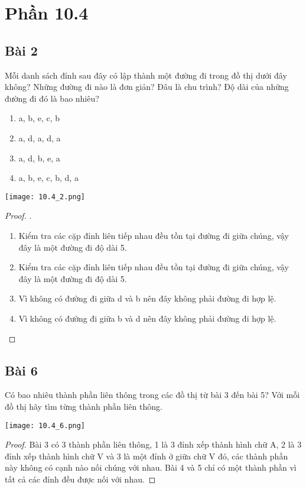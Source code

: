 \section*{Phần 10.4}
\subsection*{Bài 2}
Mỗi danh sách đỉnh sau đây có lập thành một đường đi trong đồ thị dưới đây không? Những đường đi nào là đơn giản? Đâu là chu trình? Độ dài của những đường đi đó là bao nhiêu?
\begin{enumerate}[label=\alph*)]
    \item a, b, e, c, b
    \item a, d, a, d, a
    \item a, d, b, e, a
    \item a, b, e, c, b, d, a
\end{enumerate}
\begin{center}
    \texttt{[image: 10.4\_2.png]}
\end{center}
\begin{proof}.
    \begin{enumerate}[label=\alph*)]
        \item Kiểm tra các cặp đỉnh liên tiếp nhau đều tồn tại đường đi giữa chúng, vậy đây là một đường đi độ dài 5.
        \item Kiểm tra các cặp đỉnh liên tiếp nhau đều tồn tại đường đi giữa chúng, vậy đây là một đường đi độ dài 5.
        \item Vì không có đường đi giữa d và b nên đây không phải đường đi hợp lệ.
        \item Vì không có đường đi giữa b và d nên đây không phải đường đi hợp lệ.
    \end{enumerate}
\end{proof}
\subsection*{Bài 6}
Có bao nhiêu thành phần liên thông trong các đồ thị từ bài 3 đến bài 5? Với mỗi đồ thị hãy tìm từng thành phần liên thông.
\begin{center}
    \texttt{[image: 10.4\_6.png]}
\end{center}
\begin{proof}
    Bài 3 có 3 thành phần liên thông, 1 là 3 đỉnh xếp thành hình chữ A, 2 là 3 đỉnh xếp thành hình chữ V và 3 là một đỉnh ở giữa chữ V đó, các thành phần này không có cạnh nào nối chúng với nhau. Bài 4 và 5 chỉ có một thành phần vì tất cả các đỉnh đều được nối với nhau.
\end{proof}

